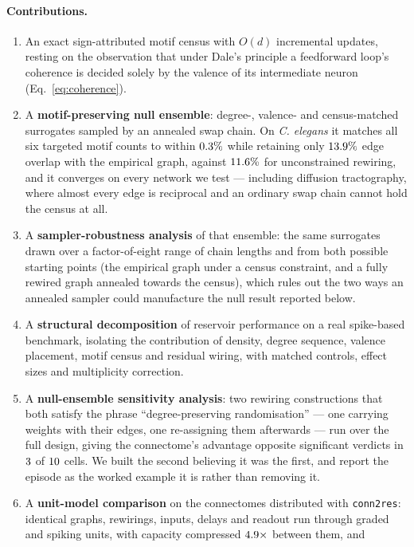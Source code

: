 \paragraph{Contributions.}
\begin{enumerate}[leftmargin=1.2em,itemsep=2pt]
\item An exact sign-attributed motif census with $O(d)$ incremental updates, resting on
the observation that under Dale's principle a feedforward loop's coherence is decided
solely by the valence of its intermediate neuron (Eq.~\ref{eq:coherence}).
\item A \textbf{motif-preserving null ensemble}: degree-, valence- and census-matched
surrogates sampled by an annealed swap chain. On \textit{C. elegans} it matches all six
targeted motif counts to within $0.3\%$ while retaining only
$13.9\%$ edge overlap with the empirical graph, against $11.6\%$
for unconstrained rewiring, and it converges on every network we test --- including
diffusion tractography, where almost every edge is reciprocal and an ordinary swap
chain cannot hold the census at all.
\item A \textbf{sampler-robustness analysis} of that ensemble: the same surrogates drawn
over a factor-of-eight range of chain lengths and from both possible starting points
(the empirical graph under a census constraint, and a fully rewired graph annealed
towards the census), which rules out the two ways an annealed sampler could manufacture
the null result reported below.
\item A \textbf{structural decomposition} of reservoir performance on a real
spike-based benchmark, isolating the contribution of density, degree sequence, valence
placement, motif census and residual wiring, with matched controls, effect sizes and
multiplicity correction.
\item A \textbf{null-ensemble sensitivity analysis}: two rewiring constructions that
both satisfy the phrase ``degree-preserving randomisation'' --- one carrying weights with
their edges, one re-assigning them afterwards --- run over the full design, giving the
connectome's advantage opposite significant verdicts in $3$ of
$10$ cells. We built the second believing it was the first, and report the
episode as the worked example it is rather than removing it.
\item A \textbf{unit-model comparison} on the connectomes distributed with
\texttt{conn2res}: identical graphs, rewirings, inputs, delays and readout run through
graded and spiking units, with capacity compressed $4.9\times$ between them, and

\end{enumerate}
